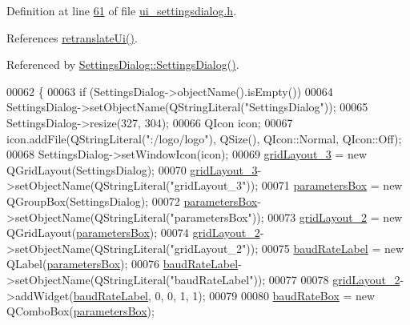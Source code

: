 Definition at line \hyperlink{a00054_source_l00061}{61} of file \hyperlink{a00054_source}{ui\+\_\+settingsdialog.\+h}.



References \hyperlink{a00054_source_l00198}{retranslate\+Ui()}.



Referenced by \hyperlink{a00044_source_l00052}{Settings\+Dialog\+::\+Settings\+Dialog()}.


\begin{DoxyCode}
00062     \{
00063         \textcolor{keywordflow}{if} (SettingsDialog->objectName().isEmpty())
00064             SettingsDialog->setObjectName(QStringLiteral(\textcolor{stringliteral}{"SettingsDialog"}));
00065         SettingsDialog->resize(327, 304);
00066         QIcon icon;
00067         icon.addFile(QStringLiteral(\textcolor{stringliteral}{":/logo/logo"}), QSize(), QIcon::Normal, QIcon::Off);
00068         SettingsDialog->setWindowIcon(icon);
00069         \hyperlink{a00029_a2cc53955b73f22f0cfcf508da4654b16}{gridLayout\_3} = \textcolor{keyword}{new} QGridLayout(SettingsDialog);
00070         \hyperlink{a00029_a2cc53955b73f22f0cfcf508da4654b16}{gridLayout\_3}->setObjectName(QStringLiteral(\textcolor{stringliteral}{"gridLayout\_3"}));
00071         \hyperlink{a00029_a47cebbe70a990bd1f309250101022889}{parametersBox} = \textcolor{keyword}{new} QGroupBox(SettingsDialog);
00072         \hyperlink{a00029_a47cebbe70a990bd1f309250101022889}{parametersBox}->setObjectName(QStringLiteral(\textcolor{stringliteral}{"parametersBox"}));
00073         \hyperlink{a00029_a7b71d6038a34f600625f007630c5234e}{gridLayout\_2} = \textcolor{keyword}{new} QGridLayout(\hyperlink{a00029_a47cebbe70a990bd1f309250101022889}{parametersBox});
00074         \hyperlink{a00029_a7b71d6038a34f600625f007630c5234e}{gridLayout\_2}->setObjectName(QStringLiteral(\textcolor{stringliteral}{"gridLayout\_2"}));
00075         \hyperlink{a00029_a57e59712bae4f482b1ff1d61c81471e8}{baudRateLabel} = \textcolor{keyword}{new} QLabel(\hyperlink{a00029_a47cebbe70a990bd1f309250101022889}{parametersBox});
00076         \hyperlink{a00029_a57e59712bae4f482b1ff1d61c81471e8}{baudRateLabel}->setObjectName(QStringLiteral(\textcolor{stringliteral}{"baudRateLabel"}));
00077 
00078         \hyperlink{a00029_a7b71d6038a34f600625f007630c5234e}{gridLayout\_2}->addWidget(\hyperlink{a00029_a57e59712bae4f482b1ff1d61c81471e8}{baudRateLabel}, 0, 0, 1, 1);
00079 
00080         \hyperlink{a00029_a766a61db4a8c72219543f7c096ae5601}{baudRateBox} = \textcolor{keyword}{new} QComboBox(\hyperlink{a00029_a47cebbe70a990bd1f309250101022889}{parametersBox});

\end{DoxyCode}
